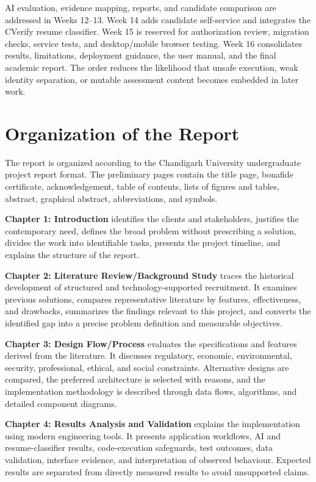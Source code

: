 \documentclass[12pt,a4paper,oneside]{report}
\begin{document}
AI evaluation, evidence mapping, reports, and candidate comparison are addressed in
Weeks 12--13. Week 14 adds candidate self-service and integrates the CVerify resume
classifier. Week 15 is reserved for authorization review, migration checks, service
tests, and desktop/mobile browser testing. Week 16 consolidates results, limitations,
deployment guidance, the user manual, and the final academic report. The order reduces
the likelihood that unsafe execution, weak identity separation, or mutable assessment
content becomes embedded in later work.

\clearpage
\section{Organization of the Report}

The report is organized according to the Chandigarh University undergraduate project
report format. The preliminary pages contain the title page, bonafide certificate,
acknowledgement, table of contents, lists of figures and tables, abstract, graphical
abstract, abbreviations, and symbols.

\textbf{Chapter 1: Introduction} identifies the clients and stakeholders, justifies
the contemporary need, defines the broad problem without prescribing a solution,
divides the work into identifiable tasks, presents the project timeline, and explains
the structure of the report.

\textbf{Chapter 2: Literature Review/Background Study} traces the historical
development of structured and technology-supported recruitment. It examines previous
solutions, compares representative literature by features, effectiveness, and
drawbacks, summarizes the findings relevant to this project, and converts the
identified gap into a precise problem definition and measurable objectives.

\textbf{Chapter 3: Design Flow/Process} evaluates the specifications and features
derived from the literature. It discusses regulatory, economic, environmental,
security, professional, ethical, and social constraints. Alternative designs are
compared, the preferred architecture is selected with reasons, and the implementation
methodology is described through data flows, algorithms, and detailed component
diagrams.

\textbf{Chapter 4: Results Analysis and Validation} explains the implementation using
modern engineering tools. It presents application workflows, AI and resume-classifier
results, code-execution safeguards, test outcomes, data validation, interface evidence,
and interpretation of observed behaviour. Expected results are separated from
directly measured results to avoid unsupported claims.
\end{document}
